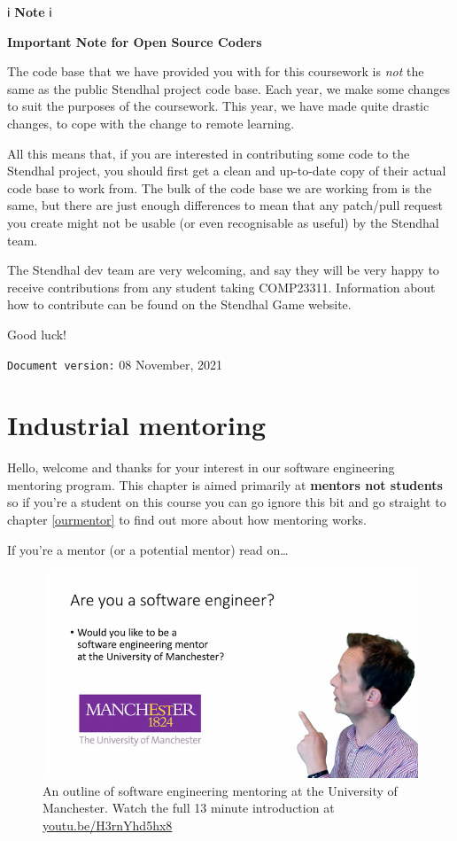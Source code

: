 \documentclass[
]{book}
\begin{document}
ℹ️ \textbf{Note} ℹ️

\textbf{Important Note for Open Source Coders}

The code base that we have provided you with for this coursework is \emph{not} the same as the public Stendhal project code base. Each year, we make some changes to suit the purposes of the coursework. This year, we have made quite drastic changes, to cope with the change to remote learning.

All this means that, if you are interested in contributing some code to the Stendhal project, you should first get a clean and up-to-date copy of their actual code base to work from. The bulk of the code base we are working from is the same, but there are just enough differences to mean that any patch/pull request you create might not be usable (or even recognisable as useful) by the Stendhal team.

The Stendhal dev team are very welcoming, and say they will be very happy to receive contributions from any student taking COMP23311. Information about how to contribute can be found on the Stendhal Game website.

Good luck!

\texttt{Document\ version:} 08 November, 2021

\hypertarget{mentoring}{%
\chapter{Industrial mentoring}\label{mentoring}}

Hello, welcome and thanks for your interest in our software engineering mentoring program. This chapter is aimed primarily at \textbf{mentors not students} so if you're a student on this course you can go ignore this bit and go straight to chapter \ref{ourmentor} to find out more about how mentoring works.

If you're a mentor (or a potential mentor) read on\ldots{}

\begin{figure}

{\centering \includegraphics[width=1\linewidth]{images/software-mentoring} 

}

\caption{An outline of software engineering mentoring at the University of Manchester. Watch the full 13 minute introduction at \href{https://youtu.be/H3rnYhd5hx8}{youtu.be/H3rnYhd5hx8}}\label{fig:mentoring-fig}
\end{figure}
\end{document}
